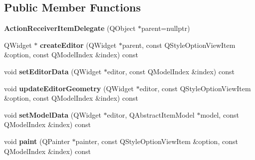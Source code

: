 \subsection*{\-Public \-Member \-Functions}
\begin{DoxyCompactItemize}
\item 
\hypertarget{class_action_receiver_item_delegate_afa1daaa792d41f91dcc4422027594c18}{{\bfseries \-Action\-Receiver\-Item\-Delegate} (\-Q\-Object $\ast$parent=nullptr)}\label{class_action_receiver_item_delegate_afa1daaa792d41f91dcc4422027594c18}

\item 
\hypertarget{class_action_receiver_item_delegate_ab0daa333d4865527244ef44e6b92c501}{\-Q\-Widget $\ast$ {\bfseries create\-Editor} (\-Q\-Widget $\ast$parent, const \-Q\-Style\-Option\-View\-Item \&option, const \-Q\-Model\-Index \&index) const }\label{class_action_receiver_item_delegate_ab0daa333d4865527244ef44e6b92c501}

\item 
\hypertarget{class_action_receiver_item_delegate_af3c8c1f32effe3aece85fcbc1d38dde0}{void {\bfseries set\-Editor\-Data} (\-Q\-Widget $\ast$editor, const \-Q\-Model\-Index \&index) const }\label{class_action_receiver_item_delegate_af3c8c1f32effe3aece85fcbc1d38dde0}

\item 
\hypertarget{class_action_receiver_item_delegate_aed91d9f84ac87d8f29cc8840e8ad1c5a}{void {\bfseries update\-Editor\-Geometry} (\-Q\-Widget $\ast$editor, const \-Q\-Style\-Option\-View\-Item \&option, const \-Q\-Model\-Index \&index) const }\label{class_action_receiver_item_delegate_aed91d9f84ac87d8f29cc8840e8ad1c5a}

\item 
\hypertarget{class_action_receiver_item_delegate_aec2f38a23d4e820523ec0cf0c5815b10}{void {\bfseries set\-Model\-Data} (\-Q\-Widget $\ast$editor, \-Q\-Abstract\-Item\-Model $\ast$model, const \-Q\-Model\-Index \&index) const }\label{class_action_receiver_item_delegate_aec2f38a23d4e820523ec0cf0c5815b10}

\item 
\hypertarget{class_action_receiver_item_delegate_a4439e5a1577b2b1e4e33c2f117779267}{void {\bfseries paint} (\-Q\-Painter $\ast$painter, const \-Q\-Style\-Option\-View\-Item \&option, const \-Q\-Model\-Index \&index) const }\label{class_action_receiver_item_delegate_a4439e5a1577b2b1e4e33c2f117779267}

\end{DoxyCompactItemize}


